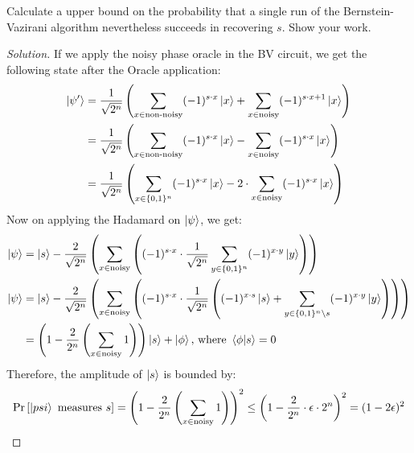\begin{solution}[label=ques:4a]
  \begin{question}
    Calculate a upper bound on the
probability that a single run of
the Bernstein-Vazirani algorithm nevertheless succeeds in recovering
$s$. Show your work.
  \end{question}
  \tcblower{}
  \begin{proof}[Solution]
    If we apply the noisy phase oracle in the BV circuit, we get the following state after the Oracle application:
    \begin{equation}
      \begin{split}
        \ket{\psi'} &= \frac{1}{\sqrt{2^n}}\left(\sum_{x\in\text{non-noisy}}(-1)^{s\cdot x}\ket{x} + \sum_{x\in\text{noisy}}(-1)^{s\cdot x + 1}\ket{x}\right)\\
        &= \frac{1}{\sqrt{2^n}}\left(\sum_{x\in\text{non-noisy}}(-1)^{s\cdot x}\ket{x} - \sum_{x\in\text{noisy}}(-1)^{s\cdot x}\ket{x}\right)\\
        &= \frac{1}{\sqrt{2^n}}\left(\sum_{x\in \{0, 1\}^n}(-1)^{s\cdot x}\ket{x} - 2\cdot\sum_{x\in\text{noisy}}(-1)^{s\cdot x}\ket{x}\right)
      \end{split}
      \label{eq:noisybvpsi}
    \end{equation}
    Now on applying the Hadamard on $\ket{\psi}$, we get:
    \begin{equation}
      \begin{split}
        \ket{\psi} &= \ket{s} - \frac{2}{\sqrt{2^n}}\left(\sum_{x\in\text{noisy}}\left((-1)^{s\cdot x}\cdot\frac{1}{\sqrt{2^n}}\sum_{y\in\{0, 1\}^n}(-1)^{x\cdot y}\ket{y}\right)\right)\\
        \ket{\psi} &= \ket{s} - \frac{2}{\sqrt{2^n}}\left(\sum_{x\in\text{noisy}}\left((-1)^{s\cdot x}\cdot\frac{1}{\sqrt{2^n}}\left((-1)^{x\cdot s}\ket{s} + \sum_{y\in\{0, 1\}^n\setminus s}(-1)^{x\cdot y}\ket{y}\right)\right)\right)\\
        &= \left(1 - \frac{2}{2^n}\left(\sum_{x\in\text{noisy}}1\right)\right)\ket{s} + \ket{\phi}\text{, where }\braket{\phi|s} = 0\\
      \end{split}
      \label{eq:noisybvfinal}
    \end{equation}
    Therefore, the amplitude of $\ket{s}$ is bounded by:
    \begin{equation}
      \Pr\left[ \ket{psi}\text{ measures }s \right] = \left(1 - \frac{2}{2^n}\left(\sum_{x\in\text{noisy}}1\right)\right)^2 \leq \left(1 - \frac{2}{2^n}\cdot \epsilon\cdot 2^n\right)^2 = (1 - 2\epsilon)^2
      \label{eq:noisybvbound}
    \end{equation}
  \end{proof}
\end{solution}

